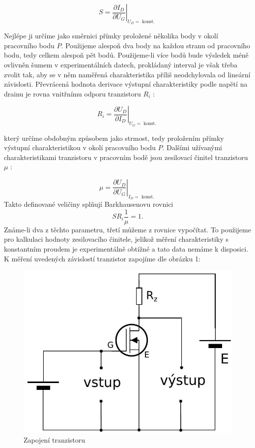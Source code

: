 \documentclass[czech,11pt,a4paper]{article}
\begin{document}
\begin{multicols}{2}
	\begin{equation}
		S=\left.\frac{\partial I_{D}}{\partial U_{G}}\right|_{U_{D}=\text { konst. }} 
	\end{equation}
	
	
	Nejlépe ji určíme jako směrnici přímky proložené několika body v okolí pracovního bodu $P$. Použijeme alespoň dva body na každou stranu od pracovního bodu, tedy celkem alespoň pět bodů. Použijeme-li více bodů bude výsledek méně ovlivněn šumem v experimentálních datech, prokládaný interval je však třeba zvolit tak, aby se v něm naměřená charakteristika příliš neodchylovala od lineární závislosti. Převrácená hodnota derivace výstupní charakteristiky podle napětí na drainu je rovna vnitřnímu odporu tranzistoru $R_{i}$ :
	
	\begin{equation}
		R_{i}=\left.\frac{\partial U_{D}}{\partial I_{D}}\right|_{U_{G}=\text { konst. }} 
	\end{equation}
	
	který určíme obdobným způsobem jako strmost, tedy proložením přímky výstupní charakteristikou v okolí pracovního bodu $P$. Dalšími užívanými charakteristikami tranzistoru v pracovním bodě jsou zesilovací činitel tranzistoru $\mu$ :
	
	\begin{equation}
		\mu=\left.\frac{\partial U_{D}}{\partial U_{G}}\right|_{I_{D}=\text { konst. }}
	\end{equation}
	Takto definované veličiny splňují Barkhausenovu rovnici
	\begin{equation}
		SR_i\frac 1 \mu = 1.
	\end{equation}
	Známe-li dva z těchto parametru, třetí můžeme z rovnice vypočítat. To použijeme pro kalkulaci hodnoty zesilovacího činitele, jelikož měření charakteristiky s konstantním proudem je experimentálně obtížné a tato data nemáme k disposici.
	K měření uvedených závislostí tranzistor zapojíme dle obrázku 1:
	\begin{figure}[H]
		\begin{center}
			
			\includegraphics[width=0.8\linewidth, ]{zapojeni1} 
			\caption{Zapojení tranzistoru}
		\end{center}
		

\end{figure}
\end{multicols}
\end{document}
